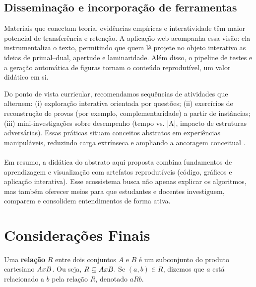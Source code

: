 \documentclass[12pt,a4paper]{article}
\def\emph#1{#1}%
\def\times{\string x}%
\begin{document}
\subsection{Disseminação e incorporação de ferramentas}
Materiais que conectam teoria, evidências empíricas e interatividade têm maior potencial de transferência e retenção. A aplicação web acompanha essa visão: ela instrumentaliza o texto, permitindo que quem lê projete no objeto interativo as ideias de primal--dual, apertude e laminaridade. Além disso, o \emph{pipeline} de testes e a geração automática de figuras tornam o conteúdo reprodutível, um valor didático em si.

Do ponto de vista curricular, recomendamos sequências de atividades que alternem: (i) exploração interativa orientada por questões; (ii) exercícios de reconstrução de provas (por exemplo, complementaridade) a partir de instâncias; (iii) mini-investigações sobre desempenho (tempo vs. |A|, impacto de estruturas adversárias). Essas práticas situam conceitos abstratos em experiências manipuláveis, reduzindo carga extrínseca e ampliando a ancoragem conceitual \cite{mayer2009multimedia,sweller1988cognitive}.

\paragraph{}
Em resumo, a didática do abstrato aqui proposta combina fundamentos de aprendizagem e visualização com artefatos reprodutíveis (código, gráficos e aplicação interativa). Esse ecossistema busca não apenas explicar os algoritmos, mas também oferecer meios para que estudantes e docentes investiguem, comparem e consolidem entendimentos de forma ativa.

\section{Considerações Finais}
\paragraph{}
Uma \textbf{relação} \(R\) entre dois conjuntos \(A\) e \(B\) é um subconjunto do produto cartesiano \(A \times B\). Ou seja, \(R \subseteq A \times B\). Se \((a,b) \in R\), dizemos que \(a\) está relacionado a \(b\) pela relação \(R\), denotado \(aRb\).
\end{document}
